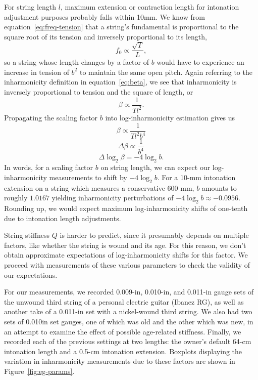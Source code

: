 \documentclass[12pt]{cmuthesis}
\begin{document}
For string length $l$, maximum extension or contraction length for intonation adjustment purposes probably falls within 10mm. We know from equation~\eqref{eq:freq-tension} that a string's fundamental is proportional to the square root of its tension and inversely proportional to its length,
\begin{equation}
f_0 \propto \frac{\sqrt{T}}{L},
\end{equation}
so a string whose length changes by a factor of $b$ would have to experience an increase in tension of $b^2$ to maintain the same open pitch. Again referring to the inharmonicity definition in equation~\eqref{eq:beta}, we see that inharmonicity is inversely proportional to tension and the square of length, or
\begin{equation}
\beta \propto \frac{1}{Tl^2}.
\end{equation}
Propagating the scaling factor $b$ into log-inharmonicity estimation gives us
\begin{equation}
\beta \propto \frac{1}{Tl^2b^4}
\end{equation}
\begin{equation}
\Delta\beta \propto \frac{1}{b^4}
\end{equation}
\begin{equation}
\Delta\log_2\beta = -4\log_2b.
\end{equation}
In words, for a scaling factor $b$ on string length, we can expect our log-inharmonicity measurements to shift by $-4\log_2b$. For a 10-mm intonation extension on a string which measures a conservative 600 mm, $b$ amounts to roughly $1.0167$ yielding inharmonicity perturbations of $-4\log_2b \approx -0.0956$. Rounding up, we would expect maximum log-inharmonicity shifts of one-tenth due to intonation length adjustments.

String stiffness $Q$ is harder to predict, since it presumably depends on multiple factors, like whether the string is wound and its age. For this reason, we don't obtain approximate expectations of log-inharmonicity shifts for this factor. We proceed with measurements of these various parameters to check the validity of our expectations.

For our measurements, we recorded 0.009-in, 0.010-in, and 0.011-in gauge sets of the unwound third string of a personal electric guitar (Ibanez RG), as well as another take of a 0.011-in set with a nickel-wound third string. We also had two sets of 0.010in set gauges, one of which was old and the other which was new, in an attempt to examine the effect of possible age-related stiffness. Finally, we recorded each of the previous settings at two lengths: the owner's default 64-cm intonation length and a 0.5-cm intonation extension. Boxplots displaying the variation in inharmonicity measurements due to these factors are shown in Figure~\ref{fig:eg-params}.
\end{document}

